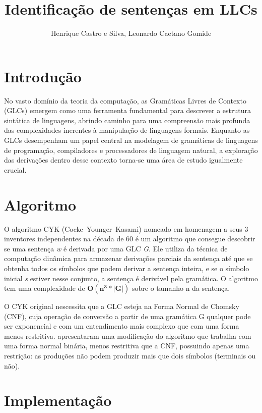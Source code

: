 \documentclass[12pt]{article}
\title{Identificação de sentenças em LLCs}
\author{Henrique Castro e Silva\inst{1}, Leonardo Caetano Gomide\inst{1}}
\begin{document}
 

\maketitle

\section{Introdução}


No vasto domínio da teoria da computação, as Gramáticas Livres de Contexto (GLCs) emergem como uma ferramenta fundamental para descrever a estrutura sintática de linguagens, abrindo caminho para uma compreensão mais profunda das complexidades inerentes à manipulação de linguagens formais. Enquanto as GLCs desempenham um papel central na modelagem de gramáticas de linguagens de programação, compiladores e processadores de linguagem natural, a exploração das derivações dentro desse contexto torna-se uma área de estudo igualmente crucial.

\section{Algoritmo} \label{sec:firstpage}

O algoritmo CYK (Cocke–Younger–Kasami) nomeado em homenagem a seus 3 inventores independentes na década de 60 é um algoritmo que consegue descobrir se uma sentença \textit{w} é derivada por uma GLC \textit{G}. Ele utiliza da técnica de computação dinâmica para armazenar derivações parciais da sentença até que se obtenha todos os símbolos que podem derivar a sentença inteira, e se o símbolo inicial \textit{s} estiver nesse conjunto, a sentença é derivável pela gramática. O algoritmo tem uma complexidade de $\mathbf{O(n^3 * |G|)}$ sobre o tamanho n da sentença.

O CYK original nescessita que a GLC esteja na Forma Normal de Chomsky (CNF), cuja operação de conversão a partir de uma gramática G qualquer pode ser exponencial e com um entendimento mais complexo que com uma forma menos restritiva. \cite{2nf:Lange} apresentaram uma modificação do algoritmo que trabalha com uma forma normal binária, menos restritiva que a CNF, possuindo apenas uma restrição: as produções não podem produzir mais que dois símbolos (terminais ou não). 

\section{Implementação}
\end{document}
